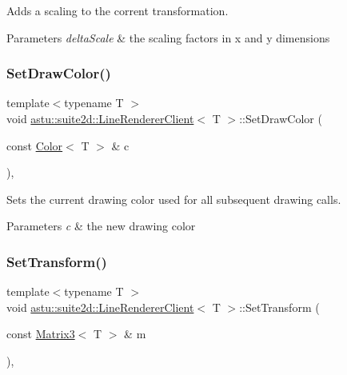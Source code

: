 Adds a scaling to the corrent transformation.


\begin{DoxyParams}{Parameters}
{\em delta\+Scale} & the scaling factors in x and y dimensions \\
\hline
\end{DoxyParams}
\mbox{\label{classastu_1_1suite2d_1_1LineRendererClient_af1cd4a97304108a78db34861f8d40c2a}} 
\subsubsection{\texorpdfstring{Set\+Draw\+Color()}{SetDrawColor()}}
{\footnotesize\ttfamily template$<$typename T $>$ \\
void \hyperlink{classastu_1_1suite2d_1_1LineRendererClient}{astu\+::suite2d\+::\+Line\+Renderer\+Client}$<$ T $>$\+::Set\+Draw\+Color (\begin{DoxyParamCaption}\item[{const \hyperlink{classastu_1_1Color}{Color}$<$ T $>$ \&}]{c }\end{DoxyParamCaption})\hspace{0.3cm}{\ttfamily [inline]}, {\ttfamily [protected]}}

Sets the current drawing color used for all subsequent drawing calls.


\begin{DoxyParams}{Parameters}
{\em c} & the new drawing color \\
\hline
\end{DoxyParams}
\mbox{\label{classastu_1_1suite2d_1_1LineRendererClient_aa53ada81a5ffff517341318588cdf329}} 
\subsubsection{\texorpdfstring{Set\+Transform()}{SetTransform()}}
{\footnotesize\ttfamily template$<$typename T $>$ \\
void \hyperlink{classastu_1_1suite2d_1_1LineRendererClient}{astu\+::suite2d\+::\+Line\+Renderer\+Client}$<$ T $>$\+::Set\+Transform (\begin{DoxyParamCaption}\item[{const \hyperlink{classastu_1_1Matrix3}{Matrix3}$<$ T $>$ \&}]{m }\end{DoxyParamCaption})\hspace{0.3cm}{\ttfamily [inline]}, {\ttfamily [protected]}}

